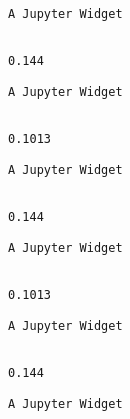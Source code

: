 \documentclass[11pt]{article}
\begin{document}
    
    \begin{verbatim}
A Jupyter Widget
    \end{verbatim}

    
    \begin{Verbatim}[commandchars=\\\{\}]

0.144

    \end{Verbatim}

    
    \begin{verbatim}
A Jupyter Widget
    \end{verbatim}

    
    \begin{Verbatim}[commandchars=\\\{\}]

0.1013

    \end{Verbatim}

    
    \begin{verbatim}
A Jupyter Widget
    \end{verbatim}

    
    \begin{Verbatim}[commandchars=\\\{\}]

0.144

    \end{Verbatim}

    
    \begin{verbatim}
A Jupyter Widget
    \end{verbatim}

    
    \begin{Verbatim}[commandchars=\\\{\}]

0.1013

    \end{Verbatim}

    
    \begin{verbatim}
A Jupyter Widget
    \end{verbatim}

    
    \begin{Verbatim}[commandchars=\\\{\}]

0.144

    \end{Verbatim}

    
    \begin{verbatim}
A Jupyter Widget
    \end{verbatim}
\end{document}
